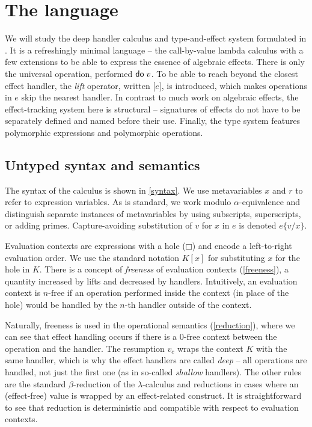 \documentclass[a4paper, 11pt,titlepage, openright, twoside]{report}
\newcommand{\keyword}[1]{\textsf{\textup{#1}}}
\newcommand{\Do}{\keyword{do}\;}
\newcommand{\Lift}[1]{\boldsymbol{[}#1\boldsymbol{]}}
\newcommand{\subst}[2]{\{#1/#2\}}
\newcommand{\Free}{\textrm{-}\mathrm{free}}
\newcommand{\+}{\enspace}
\begin{document}
\chapter{The language}\label{chap:language}
We will study the deep handler calculus and type-and-effect system formulated
in \cite{fscd19}.
It is a refreshingly minimal language – the call-by-value lambda calculus with a few extensions
to be able to express the essence of algebraic effects.
There is only the universal operation, performed $\Do v$.
To be able to reach beyond the closest effect handler,
the \textit{lift} operator, written $\Lift{e}$, is introduced,
which makes operations in $e$ skip the nearest handler.
In contrast to much work on algebraic effects, the effect-tracking system here is structural –
signatures of effects do not have to be separately defined and named before their use.
Finally, the type system features polymorphic expressions and polymorphic operations.

\section{Untyped syntax and semantics}

The syntax of the calculus is shown in \cref{syntax}.
We use metavariables $x$ and $r$ to refer to expression variables.
As is standard, we work modulo $α$-equivalence and distinguish separate instances
of metavariables by using subscripts, superscripts, or adding primes.
Capture-avoiding substitution of $v$ for $x$ in $e$ is denoted $e\subst{v}{x}$.

Evaluation contexts are expressions with a hole ($□$) and
encode a left-to-right evaluation order.
We use the standard notation $K[x]$ for substituting $x$ for the hole in $K$.
There is a concept of {\em freeness} of evaluation contexts (\cref{freeness}),
a quantity increased by lifts and decreased by handlers.
Intuitively, an evaluation context is $n\Free$
if an operation performed inside the context (in place of the hole) %
would be handled by the $n$-th handler outside of the context.

Naturally, freeness is used in the operational semantics (\cref{reduction}),
where we can see that effect handling occurs if there
is a $0\Free$ context between the operation and the handler.
The resumption $v_c$ wraps the context $K$
with the same handler, which is why the effect handlers are called {\em deep}
– all operations are handled, not just the first one (as in so-called {\em shallow} handlers).
The other rules are the standard $β$-reduction of the $λ$-calculus
and reductions in cases where an (effect-free) value is wrapped by an effect-related construct.
It is straightforward to see that reduction is deterministic
and compatible with respect to evaluation contexts.
\end{document}
